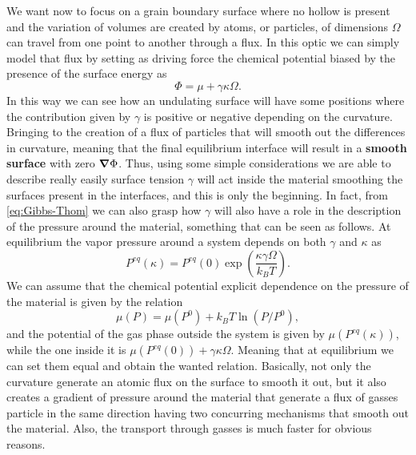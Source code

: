 We want now to focus on a grain boundary surface where no hollow is present and the variation of volumes are created by atoms, or particles, of dimensions $\Omega$ can travel from one point to another through a flux. In this optic we can simply model that flux by setting as driving force the chemical potential biased by the presence of the surface energy as
\begin{equation}
    \label{eq:CurvatureChemPot}
    \Phi = \mu + \gamma\kappa\Omega.
\end{equation}
In this way we can see how an undulating surface will have some positions where the contribution given by $\gamma$ is positive or negative depending on the curvature. Bringing to the creation of a flux of particles that will smooth out the differences in curvature, meaning that the final equilibrium interface will result in a \textbf{smooth surface} with zero $\grad \Phi$. Thus, using some simple considerations we are able to describe really easily surface tension $\gamma$ will act inside the material smoothing the surfaces present in the interfaces, and this is only the beginning. In fact, from \eqref{eq:Gibbs-Thom} we can also grasp how $\gamma$ will also have a role in the description of the pressure around the material, something that can be seen as follows.
{
    At equilibrium the vapor pressure around a system depends on both $\gamma$ and $\kappa$ as
    \begin{equation}
        P^{eq}(\kappa) = P^{eq}(0)\exp\left( \frac{\kappa\gamma\Omega}{k_BT} \right).
    \end{equation}
}
{
    We can assume that the chemical potential explicit dependence on the pressure of the material is given by the relation
    \begin{equation}
        \mu(P) = \mu(P^0) + k_BT\ln(P/P^0),
    \end{equation}
    and the potential of the gas phase outside the system is given by $\mu(P^{eq}(\kappa))$, while the one inside it is $\mu(P^{eq}(0)) + \gamma\kappa\Omega$. Meaning that at equilibrium we can set them equal and obtain the wanted relation.
}
\noindent
Basically, not only the curvature generate an atomic flux on the surface to smooth it out, but it also creates a gradient of pressure around the material that generate a flux of gasses particle in the same direction having two concurring mechanisms that smooth out the material. Also, the transport through gasses is much faster for obvious reasons.

